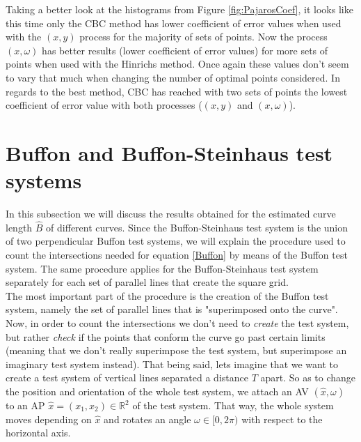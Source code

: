 Taking a better look at the histograms from Figure \ref{fig:PajarosCoef}, it looks like this time only the CBC method has lower coefficient of error values when used with the $(x,y)$ process for the majority of sets of points. Now the process $(x,\omega)$ has better results (lower coefficient of error values) for more sets of points when used with the Hinrichs method. Once again these values don't seem to vary that much when changing the number of optimal points considered. In regards to the best method, CBC has reached with two sets of points the lowest coefficient of error value with both processes ($(x,y)$ and $(x,\omega)$).\\








































\section{Buffon and Buffon-Steinhaus test systems}
In this subsection we will discuss the results obtained for the estimated curve length $\widehat{B}$ of different curves. Since the Buffon-Steinhaus test system is the union of two perpendicular Buffon test systems, we will explain the procedure used to count the intersections needed for equation \eqref{Buffon} by means of the Buffon test system. The same procedure applies for the Buffon-Steinhaus test system separately for each set of parallel lines that create the square grid.\\

The most important part of the procedure is the creation of the Buffon test system, namely the set of parallel lines that is "superimposed onto the curve". Now, in order to count the intersections we don't need to \textit{create} the test system, but rather \textit{check} if the points that conform the curve go past certain limits (meaning that we don't really superimpose the test system, but superimpose an imaginary test system instead). That being said, lets imagine that we want to create a test system of vertical lines separated a distance $T$ apart. So as to change the position and orientation of the whole test system, we attach an AV $(\widehat{x},\omega)$ to an AP $\widehat{x}=(x_1,x_2) \in \mathbb{R}^2$ of the test system. That way, the whole system moves depending on $\widehat{x}$ and rotates an angle $\omega \in [0,2\pi)$ with respect to the horizontal axis.\\


